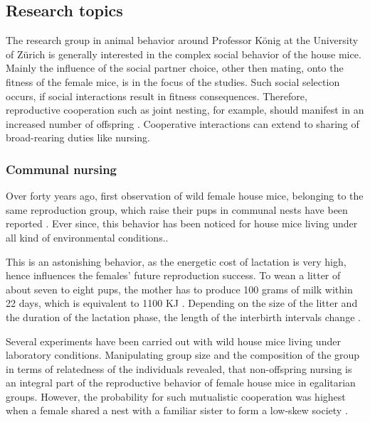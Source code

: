 \subsection{Research topics}
\label{subsec:researchtopics}

The research group in animal behavior around Professor K\"onig at the University of Z\"urich is generally interested in the complex social behavior of the house mice. Mainly the influence of the social partner choice, other then mating, onto the fitness of the female mice, is in the focus of the studies. Such social selection occurs, if social interactions result in fitness consequences. Therefore, reproductive cooperation such as joint nesting, for example, should manifest in an increased number of offspring \cite{weidt:07}. Cooperative interactions can extend to sharing of broad-rearing duties like nursing.

\subsubsection{Communal nursing}
\label{subsubsec:comnurs}

Over forty years ago, first observation of wild female house mice, belonging to the same reproduction group, which raise their pups in communal nests have been reported \cite{southwick:55}. Ever since, this behavior has been noticed for house mice living under all kind of environmental conditions.\cite{crowcroft:63, sayler:69, gandelman:70, werboff:70, baker:81}.

This is an astonishing behavior, as the energetic cost of lactation is very high, hence influences the females' future reproduction success. To wean a litter of about seven to eight pups, the mother has to produce 100 grams of milk within 22 days, which is equivalent to 1100 \acf{KJ} \cite{koenig:88}. Depending on the size of the litter and the duration of the lactation phase, the length of the interbirth intervals change \cite{fuchs:81, fuchs:82, koenig:87a, koenig:87b}.

Several experiments have been carried out with wild house mice living under laboratory conditions. Manipulating group size and the composition of the group in terms of relatedness of the individuals revealed, that non-offspring nursing is an integral part of the reproductive behavior of female house mice in egalitarian groups. However, the probability for such mutualistic cooperation was highest when a female shared a nest with a familiar sister to form a low-skew society \cite{koenig:06}.

